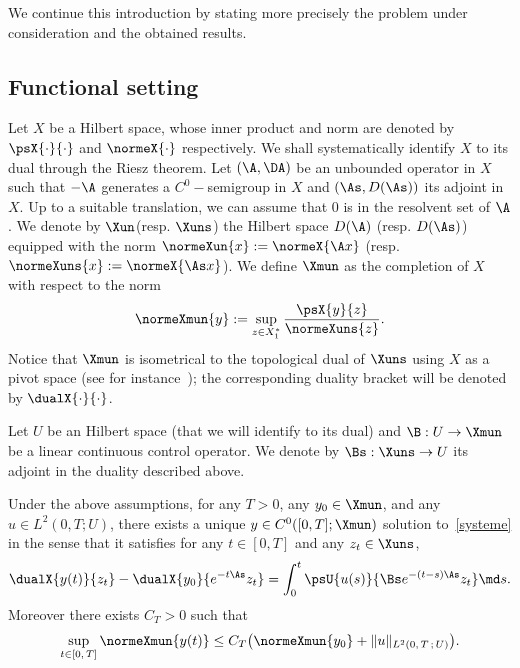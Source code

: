 We continue this introduction by stating more precisely the problem under consideration and the obtained results.



\subsection{Functional setting}

Let $X$ be a Hilbert space, whose inner product and norm are denoted by $\psX{\cdot}{\cdot}$ and $\normeX{\cdot}$ respectively. We shall systematically identify $X$ to its dual through the Riesz theorem. Let $(\A, \DA)$ be an unbounded operator in $X$ such that $-\A$ generates a $C^0-$semigroup in $X$ and $(\As,D(\As))$ its adjoint in $X$. Up to a suitable translation, we can assume that $0$ is in the resolvent set of $\A$. We denote by $\Xun$\linebreak(resp. $\Xuns$) the Hilbert space $D(\A)$ (resp. $D(\As)$) equipped with the norm $\normeXun{x} := \normeX{\A x}$ (resp. $\normeXuns{x} := \normeX{\As x}$). We define $\Xmun$ as the completion of $X$ with respect to the norm
\begin{equation*}\label{Def:NormeX-1}
\normeXmun{y} := \sup_{z \in X_1^*} \frac{\psX{y}{z}}{\normeXuns{z}}.
\end{equation*}
Notice that $\Xmun$ is isometrical to the topological dual of $\Xuns$ using $X$ as a pivot space (see for instance~\cite[Proposition~2.10.2]{TucsnakWeissBook}); the corresponding duality bracket will be denoted by $\dualX{\cdot}{\cdot}$.

Let $U$ be an Hilbert space (that we will identify to its dual) and $\B:U\to \Xmun$ be a linear continuous control operator. We denote by $\Bs:\Xuns\to U$ its adjoint in the duality described above.

\begin{prop}\label{Prop:WellposednessGeneral}
Under the above assumptions, for any $T>0$, any $y_0 \in \Xmun$, and any $u \in L^2(0,T ; U)$, there exists a unique $y \in C^0([0,T]; \Xmun)$ solution to~\eqref{systeme} in the sense that it satisfies for any $t \in [0,T]$ and any $z_t \in \Xuns$,
\begin{equation}\label{CaracterisationDualeSolutionsGeneral}
\dualX{y(t)}{z_t} - \dualX{y_0}{e^{-t\As} z_t} = \int_0^t \psU{u(s)}{ \Bs e^{-(t-s) \As} z_t} \md s.
\end{equation}
Moreover there exists $C_T>0$ such that
\[
\sup\limits_{t \in [0,\,T]} \normeXmun{y(t)} \leq C_T \big(\normeXmun{y_0} + \| u \|_{L^2(0,\,T\,;\,U)} \big).
\]
\end{prop}

